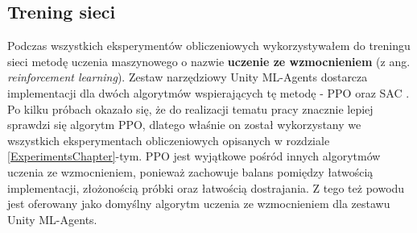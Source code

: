 \subsection*{Trening sieci}
Podczas wszystkich eksperymentów obliczeniowych wykorzystywałem do treningu sieci metodę uczenia maszynowego o nazwie \textbf{uczenie ze wzmocnieniem} (z ang. \textit{reinforcement learning}). Zestaw narzędziowy Unity ML-Agents dostarcza implementacji dla dwóch algorytmów wspierających tę metodę - PPO \cite{ppo:opis} oraz SAC \cite{sac:opis}. Po kilku próbach okazało się, że do realizacji tematu pracy znacznie lepiej sprawdzi się algorytm PPO, dlatego właśnie on został wykorzystany we wszystkich eksperymentach obliczeniowych opisanych w rozdziale \ref{ExperimentsChapter}-tym. PPO jest wyjątkowe pośród innych algorytmów uczenia ze wzmocnieniem, ponieważ zachowuje balans pomiędzy łatwością implementacji, złożonością próbki oraz łatwością dostrajania. Z tego też powodu jest oferowany jako domyślny algorytm uczenia ze wzmocnieniem dla zestawu Unity ML-Agents.